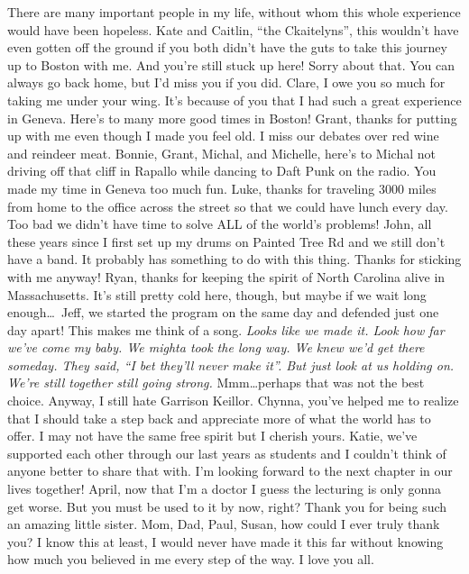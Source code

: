 There are many important people in my life, without whom this whole experience would have been hopeless.
Kate and Caitlin, ``the Ckaitelyns'', this wouldn't have even gotten off the ground  if you both didn't have the guts to take this journey up to Boston with me.  And you're still stuck up here!  Sorry about that. You can always go back home, but I'd miss you if you did. 
Clare, I owe you so much for taking me under your wing. It's because of you that I had such a great experience in Geneva. Here's to many more good times in Boston!
Grant, thanks for putting up with me even though I made you feel old. I miss our debates over red wine and reindeer meat.
Bonnie, Grant, Michal, and Michelle, here's to Michal not driving off that cliff in Rapallo while dancing to Daft Punk on the radio. You made my time in Geneva too much fun.
Luke, thanks for traveling 3000 miles from home to the office across the street so that we could have lunch every day. Too bad we didn't have time to solve ALL of the world's problems!
John, all these years since I first set up my drums on Painted Tree Rd and we still don't have a band. It probably has something to do with this thing. Thanks for sticking with me anyway!
Ryan, thanks for keeping the spirit of North Carolina alive in Massachusetts. It's still pretty cold here, though, but maybe
if we wait long enough\dots~Jeff, we started the program on the same day and defended just one day apart! This makes me think of a song. \emph{Looks like we made it. Look how far we've come my baby. We mighta took the long way. We knew we'd get there someday. They said, ``I bet they'll never make it''. But just look at us holding on. We're still together still going strong.} Mmm\dots perhaps that was not the best choice.  Anyway, I still hate Garrison Keillor.
Chynna, you've helped me to realize that I should take a step back and appreciate more of what the world has to offer.
I may not have the same free spirit but I cherish yours. 
Katie, we've supported each other through our last years as students and I couldn't think of anyone better to share that
with. I'm looking forward to the next chapter in our lives together!
April, now that I'm a doctor I guess the lecturing is only gonna get worse. But you must be used to it by now, right?
Thank you for being such an amazing little sister.
Mom, Dad, Paul, Susan, how could I ever truly thank you? I know this at least, I would never have made it this far without knowing how much you believed in me every step of the way.  I love you all.

